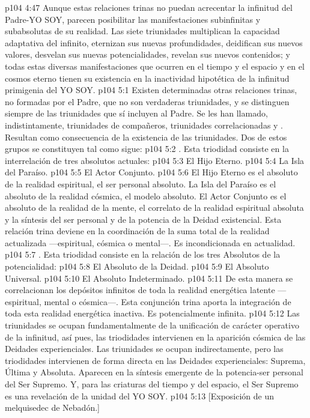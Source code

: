 \vs p104 4:47 Aunque estas relaciones trinas no puedan acrecentar la infinitud del Padre\hyp{}YO SOY, parecen posibilitar las manifestaciones subinfinitas y subabsolutas de su realidad. Las siete triunidades multiplican la capacidad adaptativa del infinito, eternizan sus nuevas profundidades, deidifican sus nuevos valores, desvelan sus nuevas potencialidades, revelan sus nuevos contenidos; y todas estas diversas manifestaciones que ocurren en el tiempo y el espacio y en el cosmos eterno tienen su existencia en la inactividad hipotética de la infinitud primigenia del YO SOY.
\vs p104 5:1 Existen determinadas otras relaciones trinas, no formadas por el Padre, que no son verdaderas triunidades, y se distinguen siempre de las triunidades que sí incluyen al Padre. Se les han llamado, indistintamente, triunidades de compañeros, triunidades correlacionadas y . Resultan como consecuencia de la existencia de las triunidades. Dos de estos grupos se constituyen tal como sigue:
\vs p104 5:2 . Esta triodidad consiste en la interrelación de tres absolutos actuales:
\vs p104 5:3 El Hijo Eterno.
\vs p104 5:4 La Isla del Paraíso.
\vs p104 5:5 El Actor Conjunto.
\vs p104 5:6 \pc El Hijo Eterno es el absoluto de la realidad espiritual, el ser personal absoluto. La Isla del Paraíso es el absoluto de la realidad cósmica, el modelo absoluto. El Actor Conjunto es el absoluto de la realidad de la mente, el correlato de la realidad espiritual absoluta y la síntesis del ser personal y de la potencia de la Deidad existencial. Esta relación trina deviene en la coordinación de la suma total de la realidad actualizada ---espiritual, cósmica o mental---. Es incondicionada en actualidad.
\vs p104 5:7 \pc {}. Esta triodidad consiste en la relación de los tres Absolutos de la potencialidad:
\vs p104 5:8 El Absoluto de la Deidad.
\vs p104 5:9 El Absoluto Universal.
\vs p104 5:10 El Absoluto Indeterminado.
\vs p104 5:11 \pc De esta manera se correlacionan los depósitos infinitos de toda la realidad energética latente ---espiritual, mental o cósmica---. Esta conjunción trina aporta la integración de toda esta realidad energética inactiva. Es potencialmente infinita.
\vs p104 5:12 \pc Las triunidades se ocupan fundamentalmente de la unificación de carácter operativo de la infinitud, así pues, las triodidades intervienen en la aparición cósmica de las Deidades experienciales. Las triunidades se ocupan indirectamente, pero las triodidades intervienen de forma directa en las Deidades experienciales: Suprema, Última y Absoluta. Aparecen en la síntesis emergente de la potencia\hyp{}ser personal del Ser Supremo. Y, para las criaturas del tiempo y del espacio, el Ser Supremo es una revelación de la unidad del YO SOY.
\vsetoff
\vs p104 5:13 [Exposición de un melquisedec de Nebadón.]
